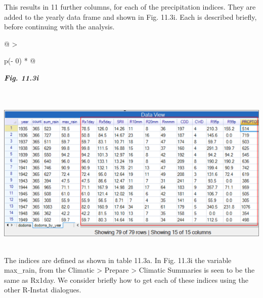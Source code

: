 \documentclass[
  letterpaper,
  DIV=11,
  numbers=noendperiod]{scrreprt}
\begin{document}
This results in 11 further columns, for each of the precipitation
indices. They are added to the yearly data frame and shown in Fig.
11.3i. Each is described briefly, before continuing with the analysis.

\begin{longtable}[]{@{}
  >{\raggedright\arraybackslash}p{(\columnwidth - 0\tabcolsep) * }@{}}
\toprule\noalign{}
\begin{minipage}[b]{\linewidth}\raggedright
\textbf{\emph{Fig. 11.3i}}
\end{minipage} \\
\midrule\noalign{}
\endhead
\bottomrule\noalign{}
\endlastfoot
\includegraphics[width=6.15578in,height=2.99946in]{figures/Fig11.3i.png} \\
\end{longtable}

The indices are defined as shown in table 11.3a. In Fig. 11.3i the
variable max\_rain, from the Climatic \textgreater{} Prepare
\textgreater{} Climatic Summaries is seen to be the same as Rx1day. We
consider briefly how to get each of these indices using the other
R-Instat dialogues.
\end{document}

